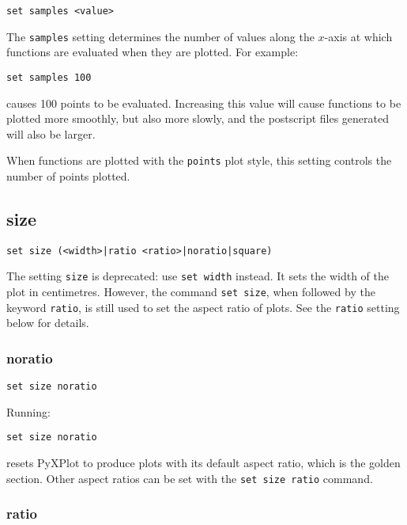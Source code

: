 \begin{verbatim}
set samples <value>
\end{verbatim}

The {\tt samples} setting determines the number of values along the $x$-axis at
which functions are evaluated when they are plotted. For example:

\begin{verbatim}
set samples 100
\end{verbatim}

\noindent causes 100 points to be evaluated.  Increasing this value will cause
functions to be plotted more smoothly, but also more slowly, and the postscript
files generated will also be larger.

When functions are plotted with the {\tt points} plot style, this setting
controls the number of points plotted.

\subsection{size}

\begin{verbatim}
set size (<width>|ratio <ratio>|noratio|square)
\end{verbatim}

The setting {\tt size} is deprecated: use {\tt set width} instead.  It sets the
width of the plot in centimetres. However, the command {\tt set size}, when
followed by the keyword {\tt ratio}, is still used to set the aspect ratio of
plots. See the {\tt ratio} setting below for details.

\subsubsection{noratio}

\begin{verbatim}
set size noratio
\end{verbatim}

Running:

\begin{verbatim}
set size noratio
\end{verbatim}

\noindent resets PyXPlot to produce plots with its default aspect ratio, which is the
golden section. Other aspect ratios can be set with the {\tt set size ratio}
command.


\subsubsection{ratio}


